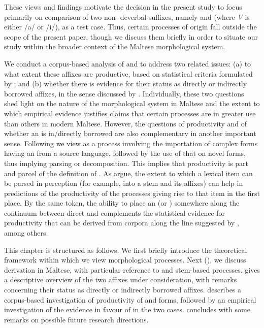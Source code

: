 \documentclass[output=paper]{LSP/langsci}
\begin{document}
These views and findings motivate the decision in the present study to focus primarily on comparison of two non- deverbal suffixes, namely {\zjoni} and {\ar} (where \textit{V} is either /a/ or /i/), as a test case. Thus, certain  processes of  origin fall outside the scope of the present paper, though we discuss them briefly in order to situate our study within the broader context of the Maltese morphological system.

We conduct a corpus-based analysis of {\ar} and {\zjoni} to address two related issues: (a) to what extent these affixes are productive, based on statistical criteria formulated by \citet{Baayen2009}; and (b) whether there is evidence for their status as directly or indirectly borrowed affixes, in the sense discussed by \citet{Seifart2015}. Individually, these two questions shed light on the nature of the morphological system in Maltese and the extent to which empirical evidence justifies claims that certain processes are in greater use than others in modern Maltese. However, the questions of productivity and of whether an  is in/directly borrowed are also complementary in another important sense. Following \citet{Seifart2015} we view  as a process involving the importation of complex forms having an  from a source language, followed by the use of that  on novel forms, thus implying parsing or decomposition. This implies that productivity is part and parcel of the definition of . As \citet{Hay2001} argue, the extent to which a lexical item can be parsed in perception (for example, into a stem and its affixes) can help in predictions of the productivity of the processes giving rise to that item in the first place. By the same token, the ability to place an  (or ) somewhere along the continuum between direct and  complements the statistical evidence for productivity that can be derived from corpora along the line suggested by \citet{Baayen2009}, among others. 

This chapter is structured as follows. We first briefly introduce the theoretical framework within which we view  morphological processes. Next (), we discuss derivation in Maltese, with particular reference to  and stem-based processes.  gives a descriptive overview of the two affixes under consideration, with remarks concerning their status as directly or indirectly borrowed affixes.  describes a corpus-based investigation of productivity of {\ar} and {\zjoni} forms, followed by an empirical investigation of the evidence in favour of  in the two cases.  concludes with some remarks on possible future research directions.
\end{document}
